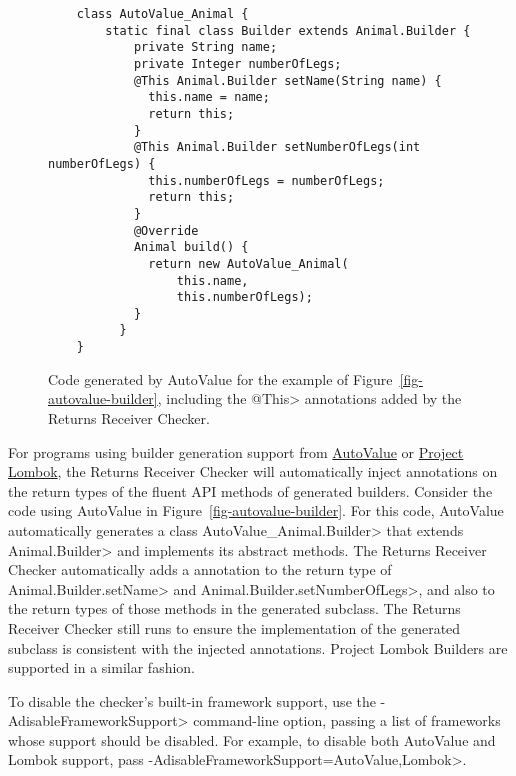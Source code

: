 \begin{figure}
    \begin{Verbatim}
    class AutoValue_Animal {
        static final class Builder extends Animal.Builder {
            private String name;
            private Integer numberOfLegs;
            @This Animal.Builder setName(String name) {
              this.name = name;
              return this;
            }
            @This Animal.Builder setNumberOfLegs(int numberOfLegs) {
              this.numberOfLegs = numberOfLegs;
              return this;
            }
            @Override
            Animal build() {
              return new AutoValue_Animal(
                  this.name,
                  this.numberOfLegs);
            }
          }
    }
    \end{Verbatim}
    \caption{Code generated by AutoValue for the example of
    Figure~\ref{fig-autovalue-builder}, including the \<@This> annotations added
    by the Returns Receiver Checker.}
    \label{fig-autovalue-builder-generated}
\end{figure}

For programs using builder generation support from
\href{https://github.com/google/auto/tree/master/value}{AutoValue} or
\href{https://projectlombok.org/}{Project Lombok}, the Returns Receiver Checker
will automatically inject 
annotations on the return types of the fluent API methods of generated builders.
Consider the code using AutoValue in Figure~\ref{fig-autovalue-builder}.  For
this code, AutoValue automatically generates a class
\<AutoValue\_Animal.Builder> that extends \<Animal.Builder> and implements its
abstract methods.  The Returns Receiver Checker automatically adds a
 annotation to the return type of
\<Animal.Builder.setName> and \<Animal.Builder.setNumberOfLegs>, and also to the
return types of those methods in the generated subclass.  The Returns Receiver
Checker still runs to ensure the implementation of the generated subclass is
consistent with the injected annotations.  Project Lombok Builders are supported
in a similar fashion.

To disable the checker's built-in framework support, use the
\<-AdisableFrameworkSupport> command-line option, passing a list of frameworks
whose support should be disabled.  For example, to disable both AutoValue and
Lombok support, pass \<-AdisableFrameworkSupport=AutoValue,Lombok>.
